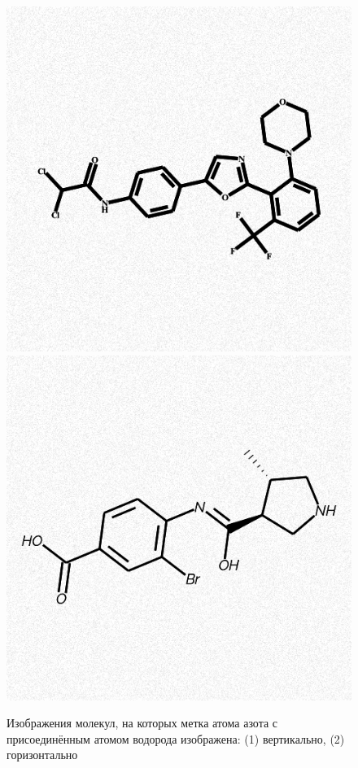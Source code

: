 \begin{figure}[h!] 
	\center
	\includegraphics [scale=0.45] {my_folder/images/nh_vert}
	\includegraphics [scale=0.45] {my_folder/images/nh_hor}
	\caption{Изображения молекул, на которых метка атома азота с присоединённым атомом водорода изображена: (1) вертикально, (2) горизонтально} 
	\label{fig:nh}  
\end{figure}

